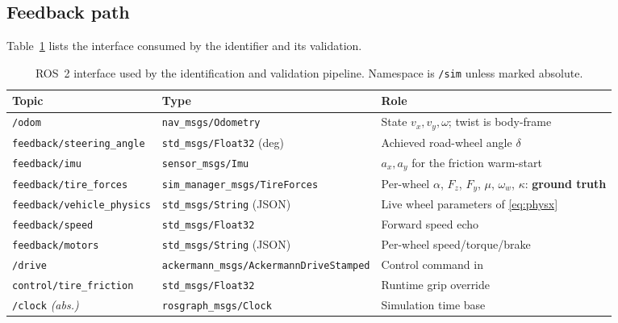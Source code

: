 \subsection*{Feedback path}
Table~\ref{tab:topics} lists the interface consumed by the identifier and its
validation.

\begin{table}[t]
\caption{ROS~2 interface used by the identification and validation pipeline.
Namespace is \texttt{/sim} unless marked absolute.}
\label{tab:topics}
\centering
\scriptsize
\setlength{\tabcolsep}{3pt}
\begin{tabular}{@{}p{2.4cm}p{2.75cm}p{2.5cm}@{}}
\toprule
Topic & Type & Role\\
\midrule
\texttt{/odom} & \texttt{nav\_msgs/Odometry} & State $v_{x},v_{y},\omega$; twist is body-frame\\
\texttt{feedback/\allowbreak steering\_angle} & \texttt{std\_msgs/Float32} (deg) & Achieved road-wheel angle $\delta$\\
\texttt{feedback/imu} & \texttt{sensor\_msgs/Imu} & $a_{x},a_{y}$ for the friction warm-start\\
\texttt{feedback/\allowbreak tire\_forces} & \texttt{sim\_manager\_\allowbreak msgs/\allowbreak TireForces} & Per-wheel $\alpha$, $F_{z}$, $F_{y}$, $\mu$, $\omega_{w}$, $\kappa$: \textbf{ground truth}\\
\texttt{feedback/\allowbreak vehicle\_physics} & \texttt{std\_msgs/String} (JSON) & Live wheel parameters of \eqref{eq:physx}\\
\texttt{feedback/speed} & \texttt{std\_msgs/Float32} & Forward speed echo\\
\texttt{feedback/motors} & \texttt{std\_msgs/String} (JSON) & Per-wheel speed/torque/brake\\
\texttt{/drive} & \texttt{ackermann\_msgs/\allowbreak Ackermann\allowbreak Drive\allowbreak Stamped} & Control command in\\
\texttt{control/\allowbreak tire\_friction} & \texttt{std\_msgs/Float32} & Runtime grip override\\
\texttt{/clock} \emph{(abs.)} & \texttt{rosgraph\_msgs/\allowbreak Clock} & Simulation time base\\
\bottomrule
\end{tabular}
\end{table}


